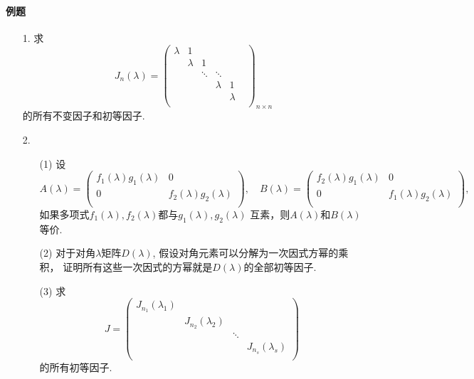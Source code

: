 \paragraph{例题}
\begin{itemize}
    \item [1.] 求
    \begin{equation}
    \nonumber
    J_n(\lambda) = 
    \begin{pmatrix}
    \lambda&1&&&&\\
    &\lambda&1&&&\\
    &&\ddots&\ddots&&\\
    &&&\lambda&1\\
    &&&&\lambda\\
    \end{pmatrix}_{n\times n}
    \end{equation}
    的所有不变因子和初等因子.
    \vspace{3cm}
    \item [2.]
    \begin{itemize}
        \item [(1)] 设
    \begin{equation}
    \nonumber
    A(\lambda) = \begin{pmatrix}
        f_1(\lambda)g_1(\lambda)&0\\
        0&f_2(\lambda)g_2(\lambda)\\
    \end{pmatrix},\quad
    B(\lambda) = \begin{pmatrix}
        f_2(\lambda)g_1(\lambda)&0\\
        0&f_1(\lambda)g_2(\lambda)\\
    \end{pmatrix},
    \end{equation}
    如果多项式$f_1(\lambda),f_2(\lambda)$都与$g_1(\lambda),g_2(\lambda)$
    互素，则$A(\lambda)$和$B(\lambda)$等价.
    \vspace{3cm}
    
    \item [(2)] 对于对角$\lambda$矩阵$D(\lambda)$, 假设对角元素可以分解为一次因式方幂的乘积，
    证明所有这些一次因式的方幂就是$D(\lambda)$的全部初等因子.
    \vspace{3cm}

    \item [(3)]
    求
    \begin{equation}
    \nonumber
    J = 
    \begin{pmatrix}
    J_{n_1}(\lambda_1)&&&\\
    &J_{n_2}(\lambda_2)&&\\
    &&\ddots&\\
    &&&J_{n_s}(\lambda_s)\\
    \end{pmatrix}
    \end{equation}
    的所有初等因子.
    \vspace{3cm}


\end{itemize}
\end{itemize}
